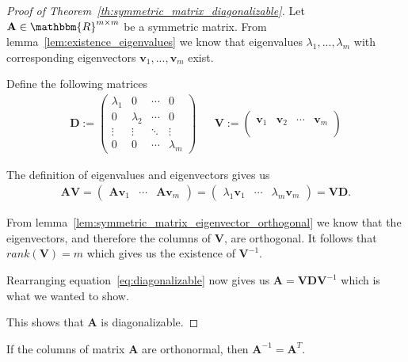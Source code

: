 \begin{proof}[Proof of Theorem~\ref{th:symmetric_matrix_diagonalizable}]
	Let $\mathbf{A} \in \mathbbm{R}^{m\times m}$ be a symmetric matrix. From lemma~\ref{lem:existence_eigenvalues} we know that eigenvalues $\lambda_1, ..., \lambda_m$ with corresponding eigenvectors $\mathbf{v}_1, ..., \mathbf{v}_m$ exist.
	
	Define the following matrices
	\begin{align*}
		\mathbf{D} := \left(\begin{matrix}
			\lambda_1 & 0 & \cdots & 0\\
			0 & \lambda_2 & \cdots & 0\\
			\vdots & \vdots & \ddots & \vdots\\
			0 & 0 & \cdots & \lambda_m
		\end{matrix}\right) &&
		\mathbf{V} := \left(\begin{matrix}
			& & &\\
			\mathbf{v}_1 & \mathbf{v}_2 & \cdots & \mathbf{v}_m\\
			& & &\\
		\end{matrix}\right)
	\end{align*}
	
	The definition of eigenvalues and eigenvectors gives us
	\begin{align}
		\label{eq:diagonalizable}
		\mathbf{AV} = \left(\begin{matrix}
			\mathbf{Av}_1 & \cdots & \mathbf{Av}_m
		\end{matrix}\right) = \left(\begin{matrix}
			\lambda_1\mathbf{v}_1 & \cdots & \lambda_m\mathbf{v}_m
		\end{matrix}\right) = \mathbf{VD}.
	\end{align}
	
	From lemma~\ref{lem:symmetric_matrix_eigenvector_orthogonal} we know that the eigenvectors, and therefore the columns of $\mathbf{V}$, are orthogonal. It follows that $rank(\mathbf{V}) = m$ which gives us the existence of $\mathbf{V}^{-1}$.
	
	Rearranging equation~\ref{eq:diagonalizable} now gives us $\mathbf{A} = \mathbf{VDV}^{-1}$ which is what we wanted to show.
	
	This shows that $\mathbf{A}$ is diagonalizable.
\end{proof}


\newpage
\begin{lemma}
	\label{lem:inverse_is_transpose}
	If the columns of matrix $\mathbf{A}$ are orthonormal, then $\mathbf{A}^{-1} = \mathbf{A}^T$.
\end{lemma}

